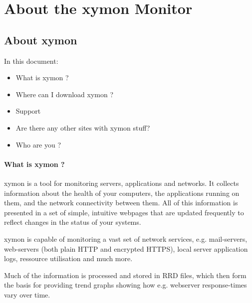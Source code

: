 \chapter{About the xymon Monitor}
\section{About xymon}


 In this document:
\begin{itemize}
\item What is xymon ?
\item Where can I download xymon ?
\item Support
\item Are there any other sites with xymon stuff?
\item Who are you ?

\end{itemize}
\subsubsection{What is xymon ?}


 xymon is a tool for monitoring servers, applications and networks. It collects information about the health of your computers, the applications running on them, and the network connectivity between them. All of this information is presented in a set of simple, intuitive webpages that are updated frequently to reflect changes in the status of your systems.


 xymon is capable of monitoring a vast set of network services, e.g. mail-servers, web-servers (both plain HTTP and encrypted HTTPS), local server application logs, ressource utilisation and much more.


 Much of the information is processed and stored in RRD files, which then form the basis for providing trend graphs showing how e.g. webserver response-times vary over time.


